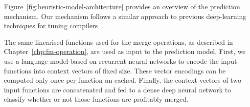 Figure~\ref{fig:heuristic-model-architecture} provides an overview of the prediction mechanism.
Our mechanism follows a similar approach to previous deep-learning techniques for tuning compilers~\cite{cummins17, mendis19}.

The same linearised functions used for the merge operations, as described in Chapter~\ref{chp:fm-operation}, are used as input to the prediction model.
First, we use a language model based on recurrent neural networks to encode the input functions into context vectors of fixed size.
These vector encodings can be computed only once per function an cached.
Finally, the context vectors of two input functions are concatenated and fed to a dense deep neural network to classify whether or not those functions are profitably merged.

